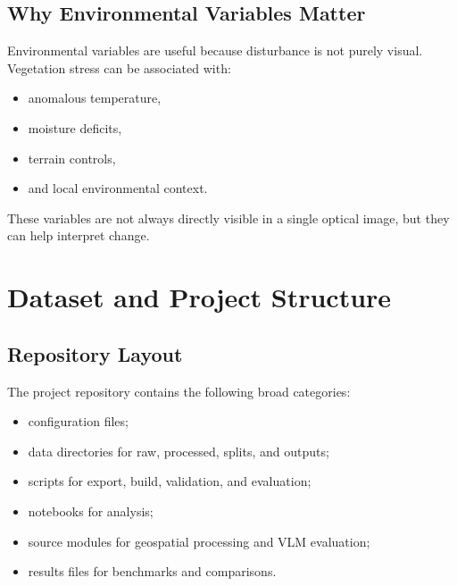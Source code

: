 \documentclass[11pt]{article}
\begin{document}
\subsection{Why Environmental Variables Matter}
Environmental variables are useful because disturbance is not purely visual. Vegetation stress can be associated with:
\begin{itemize}
    \item anomalous temperature,
    \item moisture deficits,
    \item terrain controls,
    \item and local environmental context.
\end{itemize}

These variables are not always directly visible in a single optical image, but they can help interpret change.

\section{Dataset and Project Structure}

\subsection{Repository Layout}
The project repository contains the following broad categories:
\begin{itemize}
    \item configuration files;
    \item data directories for raw, processed, splits, and outputs;
    \item scripts for export, build, validation, and evaluation;
    \item notebooks for analysis;
    \item source modules for geospatial processing and VLM evaluation;
    \item results files for benchmarks and comparisons.
\end{itemize}
\end{document}
